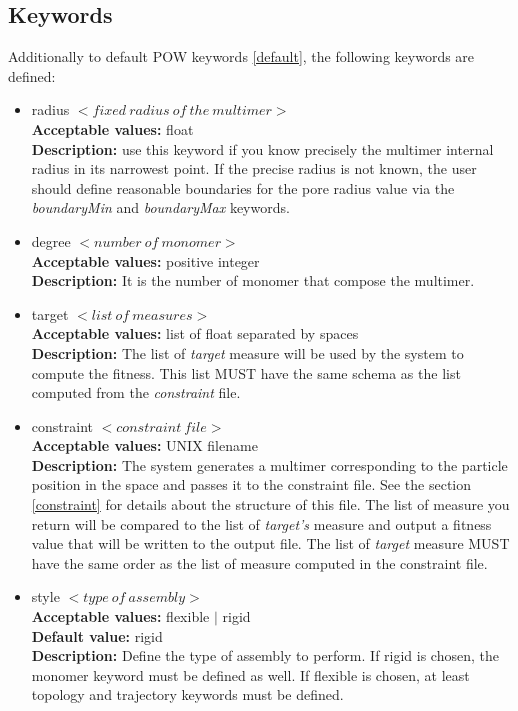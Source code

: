 \documentclass[a4paper, 12pt]{article}
\begin{document}
\subsection{Keywords}

Additionally to default POW keywords \ref{default}, the following keywords are defined:

\begin{itemize}

\item radius $< fixed\ radius\ of\ the\ multimer >$\\
\textbf{Acceptable values:} float \\
\textbf{Description:} use this keyword if you know precisely the multimer internal radius in its narrowest point. If the precise radius is not known, the user should define reasonable boundaries for the pore radius value via the \emph{boundaryMin} and \emph{boundaryMax} keywords.

\item degree $< number\ of\ monomer >$\\
\textbf{Acceptable values:} positive integer\\
\textbf{Description:} It is the number of monomer that compose the multimer.

\item target $< list\ of\ measures >$\\
\textbf{Acceptable values:} list of float separated by spaces\\
\textbf{Description:} The list of \emph{target} measure will be used by the system to compute the fitness. This list MUST have the same schema as the list computed from the \emph{constraint} file.

\item constraint $< constraint\ file >$\\
\textbf{Acceptable values:} UNIX filename\\
\textbf{Description:} The system generates a multimer corresponding to the particle position in the space and passes it to the constraint file. See the section \ref{constraint} for details about the structure of this file. The list of measure you return will be compared to the list of \emph{target's} measure and output a fitness value that will be written to the output file. The list of \emph{target} measure MUST have the same order as the list of measure computed in the constraint file.

\item style $< type\ of\ assembly >$\\
\textbf{Acceptable values:} flexible $|$ rigid\\
\textbf{Default value:} rigid\\
\textbf{Description:} Define the type of assembly to perform. If rigid is chosen, the monomer keyword must be defined as well. If flexible is chosen, at least topology and trajectory keywords must be defined.


\end{itemize}
\end{document}
